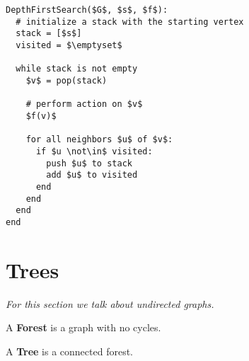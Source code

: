\documentclass[12pt]{article}
\begin{document}
  \begin{lstlisting}[]
DepthFirstSearch($G$, $s$, $f$):
  # initialize a stack with the starting vertex
  stack = [$s$]
  visited = $\emptyset$

  while stack is not empty
    $v$ = pop(stack)

    # perform action on $v$
    $f(v)$

    for all neighbors $u$ of $v$:
      if $u \not\in$ visited:
        push $u$ to stack
        add $u$ to visited
      end
    end
  end
end
  \end{lstlisting}







  \newpage

  \section{Trees}

  {\it For this section we talk about undirected graphs.}

   {
    A {\bf Forest} is a graph with no cycles.
  }

   {
    A {\bf Tree} is a connected forest.
  }


\end{document}
